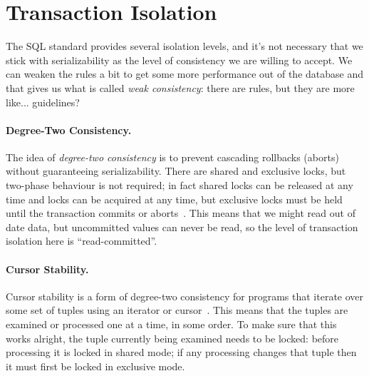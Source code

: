 




\section*{Transaction Isolation}

The SQL standard provides several isolation levels, and it's not necessary that we stick with serializability as the level of consistency we are willing to accept. We can weaken the rules a bit to get some more performance out of the database and that gives us what is called \textit{weak consistency}: there are rules, but they are more like... guidelines?

\paragraph{Degree-Two Consistency.}
The idea of \textit{degree-two consistency} is to prevent cascading rollbacks (aborts) without guaranteeing serializability. There are shared and exclusive locks, but two-phase behaviour is not required; in fact shared locks can be released at any time and locks can be acquired at any time, but exclusive locks must be held until the transaction commits or aborts~\cite{dsc}. This means that we might read out of date data, but uncommitted values can never be read, so the level of transaction isolation here is ``read-committed''.

\paragraph{Cursor Stability.} Cursor stability is a form of degree-two consistency for programs that iterate over some set of tuples using an iterator or cursor~\cite{dsc}. This means that the tuples are examined or processed one at a time, in some order. To make sure that this works alright, the tuple currently being examined needs to be locked: before processing it is locked in shared mode; if any processing changes that tuple then it must first be locked in exclusive mode. 






